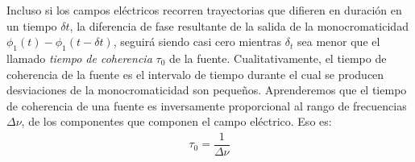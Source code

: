 \documentclass[14pt]{extarticle}
\begin{document}
Incluso si los campos eléctricos recorren trayectorias que difieren en duración en un tiempo $\delta t$, la diferencia de fase resultante de la salida de la monocromaticidad $\phi_{1} (t) - \phi_{1} (t - \delta t)$, seguirá siendo casi cero mientras $\delta_{t}$ sea menor que el llamado \textit{tiempo de coherencia} $\tau_{0}$ de la fuente. Cualitativamente, el tiempo de coherencia de la fuente es el intervalo de tiempo durante el cual se producen desviaciones de la monocromaticidad son pequeños. Aprenderemos que el tiempo de coherencia de una fuente es inversamente proporcional al rango de frecuencias $\Delta \nu$, de los componentes que componen el campo eléctrico. Eso es:
\begin{align*}
\tau_{0} = \dfrac{1}{\Delta \nu}
\end{align*}
\end{document}
